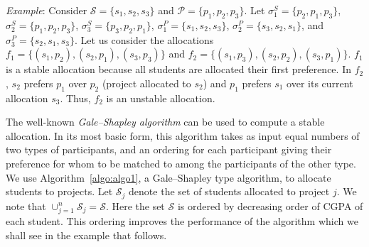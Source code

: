 \documentclass{article}
\begin{document}
\medskip
\noindent
\emph{Example}: Consider $\mathcal{S} = \{s_1,s_2,s_3\}$ and $\mathcal{P} = \{p_1,p_2,p_3\}$.
Let $\sigma^S_1 = \{p_2, p_1, p_3\}$, $\sigma^S_2 = \{p_1, p_2, p_3\}$, $\sigma^S_3 = \{p_3,p_2,p_1\}$, $\sigma^P_1 = \{s_1, s_2, s_3\}$, $\sigma^P_2 = \{s_3, s_2, s_1\}$, and $\sigma^P_3 = \{s_2, s_1, s_3\}$. Let us consider the allocations $f_1 = \{(s_1, p_2), (s_2, p_1), (s_3, p_3)\}$ and $f_2 = \{(s_1, p_3), (s_2, p_2), (s_3, p_1)\}$. $f_1$ is a stable allocation because all students are allocated their first preference. In $f_2$, $s_2$ prefers $p_1$ over $p_2$ (project allocated to $s_2$) and $p_1$ prefers $s_1$ over its current allocation $s_3$. Thus, $f_2$ is an unstable allocation.










\medskip
The well-known \emph{Gale–Shapley algorithm} can be used to compute a stable allocation. In its most basic form, this algorithm takes as input equal numbers of two types of participants, and an ordering for each participant giving their preference for whom to be matched to among the participants of the other type. We use Algorithm~\ref{algo:algo1}, a Gale–Shapley type algorithm, to allocate students to projects. Let $\mathcal{S}_j$ denote the set of students allocated to project $j$. We note that $\cup^n_{j=1} \mathcal{S}_j = \mathcal{S}$. Here the set $\mathcal{S}$ is ordered by decreasing order of CGPA of each student. This ordering improves the performance of the algorithm which we shall see in the example that follows.
\end{document}
